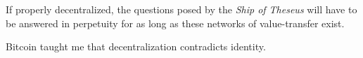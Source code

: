 If properly decentralized, the questions posed by the \textit{Ship of Theseus}
will have to be answered in perpetuity for as long as these networks of
value-transfer exist.

Bitcoin taught me that decentralization contradicts identity.

%
%
%
%
